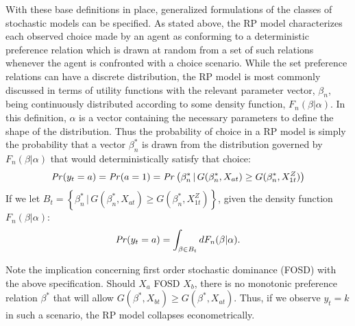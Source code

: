 \documentclass[../main.tex]{subfiles}
\begin{document}
With these base definitions in place, generalized formulations of the classes of stochastic models can be specified.
As stated above, the RP model characterizes each observed choice made by an agent as conforming to a deterministic preference relation which is drawn at random from a set of such relations whenever the agent is confronted with a choice scenario.
While the set preference relations can have a discrete distribution, the RP model is most commonly discussed in terms of utility functions with the relevant parameter vector, $\beta_n$, being continuously distributed according to some density function, $F_n(\beta | \alpha)$.
In this definition, $\alpha$ is a vector containing the necessary parameters to define the shape of the distribution.
Thus the probability of choice in a RP model is simply the probability that a vector $\beta_n^*$ is drawn from the distribution governed by $F_n(\beta | \alpha)$ that would deterministically satisfy that choice:
\begin{equation}
	\label{eq2:RP0}
	{\ensuremath{\mathit{Pr}}}(y_t=a) = {\mathit{Pr}}(a=1) = {\mathit{Pr}}\left( \beta_n^* \,|\, G(\beta_n^*,X_{at}) \geq G(\beta_n^*,X_{1t}^Z)\right)
\end{equation}
\noindent If we let $ B_t = \left\{ \beta_n^* \,|\, G(\beta_n^*,X_{at}) \geq G(\beta_n^*,X_{1t}^Z)\right\}$, given the density function $F_n(\beta | \alpha)$:
\begin{equation}
	\label{eq2:RP.f}
	{\ensuremath{\mathit{Pr}}}(y_t=a) = \int_{\beta \in B_t} dF_n(\beta|\alpha).
\end{equation}

Note the implication concerning first order stochastic dominance (FOSD){\footnotemark} with the above specification. Should $X_a$ FOSD $X_b$, there is no monotonic preference relation $\beta^*$ that will allow $G(\beta^*,X_{bt}) \geq G(\beta^*,X_{at})$.
Thus, if we observe $y_t = k$ in such a scenario, the RP model collapses econometrically.

\addtocounter{footnote}{-1}
\end{document}

